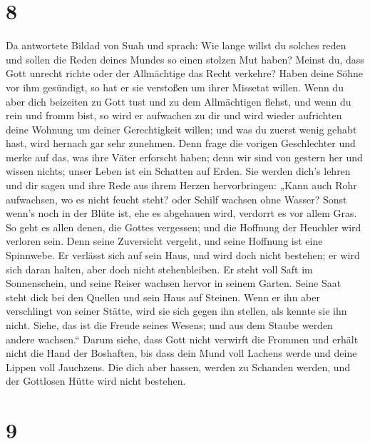 \hypertarget{section-7}{%
\section{8}\label{section-7}}

 Da antwortete Bildad von Suah und sprach: 
Wie lange willst du solches reden und sollen die Reden deines Mundes so
einen stolzen Mut haben?  Meinst du, dass Gott unrecht
richte oder der Allmächtige das Recht verkehre?  Haben
deine Söhne vor ihm gesündigt, so hat er sie verstoßen um ihrer Missetat
willen.  Wenn du aber dich beizeiten zu Gott tust und zu
dem Allmächtigen flehst,  und wenn du rein und fromm bist,
so wird er aufwachen zu dir und wird wieder aufrichten deine Wohnung um
deiner Gerechtigkeit willen;  und was du zuerst wenig
gehabt hast, wird hernach gar sehr zunehmen.  Denn frage
die vorigen Geschlechter und merke auf das, was ihre Väter erforscht
haben;  denn wir sind von gestern her und wissen nichts;
unser Leben ist ein Schatten auf Erden.  Sie werden
dich's lehren und dir sagen und ihre Rede aus ihrem Herzen
hervorbringen:  „Kann auch Rohr aufwachsen, wo es nicht
feucht steht? oder Schilf wachsen ohne Wasser?  Sonst
wenn's noch in der Blüte ist, ehe es abgehauen wird, verdorrt es vor
allem Gras.  So geht es allen denen, die Gottes
vergessen; und die Hoffnung der Heuchler wird verloren sein.
 Denn seine Zuversicht vergeht, und seine Hoffnung ist
eine Spinnwebe.  Er verlässt sich auf sein Haus, und wird
doch nicht bestehen; er wird sich daran halten, aber doch nicht
stehenbleiben.  Er steht voll Saft im Sonnenschein, und
seine Reiser wachsen hervor in seinem Garten.  Seine Saat
steht dick bei den Quellen und sein Haus auf Steinen. 
Wenn er ihn aber verschlingt von seiner Stätte, wird sie sich gegen ihn
stellen, als kennte sie ihn nicht.  Siehe, das ist die
Freude seines Wesens; und aus dem Staube werden andere wachsen.``
 Darum siehe, dass Gott nicht verwirft die Frommen und
erhält nicht die Hand der Boshaften,  bis dass dein Mund
voll Lachens werde und deine Lippen voll Jauchzens.  Die
dich aber hassen, werden zu Schanden werden, und der Gottlosen Hütte
wird nicht bestehen.

\hypertarget{section-8}{%
\section{9}\label{section-8}}

